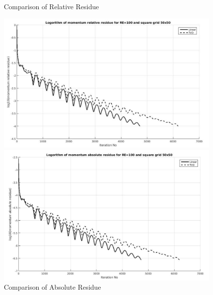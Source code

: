 \documentclass[12pt]{elsarticle}
\begin{document}
	\begin{figure}[h]
		\caption{Comparison of Relative Residue}
		\centering\includegraphics[width=1.0\linewidth]{3_rr_tvd_linear_re_100_50_50}
		\caption{Comparison of Absolute Residue}
		\centering\includegraphics[width=1.0\linewidth]{4_ar_tvd_linear_re_100_50_50}
	\end{figure}
	\clearpage
	
\end{document}
